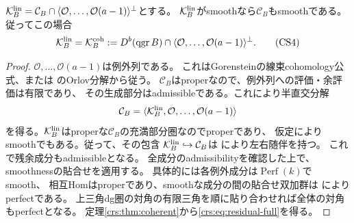 \begin{proposition}[残余のsmoothnessから全線束部分へ]
\label{crs:prop:residual-smooth}
$\mathcal K_B^{\rm lin}=\mathcal C_B\cap
\langle\mathcal O,\ldots,\mathcal O(a-1)\rangle^\perp$とする。
$\mathcal K_B^{\rm lin}$がsmoothなら$\mathcal C_B$もsmoothである。
従ってこの場合
\[
 \mathcal K_B^{\rm lin}=\mathcal K_B^{\rm coh}:=
 D^b(\operatorname{qgr}B)\cap
 \langle\mathcal O,\ldots,\mathcal O(a-1)\rangle^\perp.
 \tag{CS4}\label{crs:eq:residual-full}
\]
\end{proposition}
\begin{proof}
$\mathcal O,\ldots,\mathcal O(a-1)$は例外列である。
これはGorensteinの線束cohomology公式、または
\cite[Theorem~6.4]{LP-BS}のOrlov分解から従う。
$\mathcal C_B$はproperなので、例外列への評価・余評価は有限であり、
その生成部分はadmissibleである。これにより半直交分解
\[
 \mathcal C_B=\langle\mathcal K_B^{\rm lin},
                 \mathcal O,\ldots,\mathcal O(a-1)\rangle
\]
を得る。$\mathcal K_B^{\rm lin}$はproperな$\mathcal C_B$の充満部分圏なのでproperであり、
仮定によりsmoothでもある。従って、その包含
$\mathcal K_B^{\rm lin}\hookrightarrow\mathcal C_B$は
\cite[Lemma~4.13]{CRSPerry}により左右随伴を持つ。
これで残余成分もadmissibleとなる。
全成分のadmissibilityを確認した上で、
smoothnessの貼合せ\cite[Lemma~4.15(3)]{CRSPerry}を適用する。
具体的には各例外成分は$\operatorname{Perf}(k)$でsmooth、
相互Homはproperであり、smoothな成分の間の貼合せ双加群は
\cite[Lemma~2.8(2)]{ROGTV}によりperfectである。
上三角dg圏の対角の有限三角を順に貼り合わせれば全体の対角もperfectとなる。
定理\ref{crs:thm:coherent}から\eqref{crs:eq:residual-full}を得る。
\end{proof}

